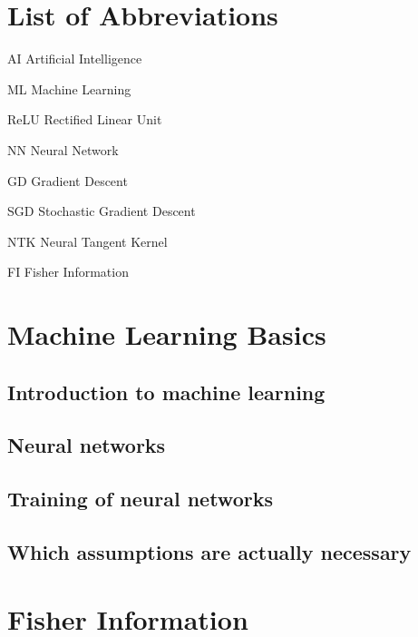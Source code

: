 \documentclass[12pt, a4paper]{report}
\begin{document}
	\chapter*{List of Abbreviations}
	\begin{abbreviations}
		\item[AI] Artificial Intelligence
		\item[ML] Machine Learning
		\item[ReLU] Rectified Linear Unit
		\item[NN] Neural Network
		\item[GD] Gradient Descent
		\item[SGD] Stochastic Gradient Descent
		\item[NTK] Neural Tangent Kernel
		\item[FI] Fisher Information
	\end{abbreviations}	
	
	\chapter{Machine Learning Basics}
	\section{Introduction to machine learning}\label{sec:MachineLearningIntroduction}
	
	\section{Neural networks}\label{sec:NeuralNetworks(BigSection)}
	
	\section{Training of neural networks}\label{sec:NeuralNetworkTraining}
	
	\section{Which assumptions are actually necessary}
	
	
	
	\chapter{Fisher Information}\label{sec:ChapterFisherInformation}
	
\end{document}
